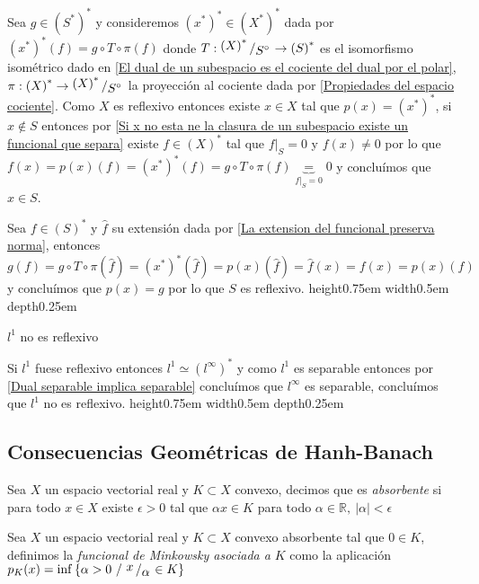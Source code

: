\documentclass[11pt]{article}
\newcommand{\R}{{\mathbb{R}}}
\newcommand{\dual}[1]{\left(#1\right)^{\ast}}
\newcommand{\ddual}[1]{\left(#1^{\ast}\right)^{\ast}}
\newcommand{\abs}[1]{\left\lvert#1\right\rvert}
\newcommand{\sett}[1]{\left\lbrace#1\right\rbrace}
\newcommand{\quotient}[2]{{\raisebox{.2em}{$#1$}\left/\raisebox{-.2em}{$#2$}\right.}}
\numberwithin{theorem}{subsection}
\newenvironment{proof}[1][Demostraci\'on]{\begin{trivlist}
		\item[\hskip \labelsep {\bfseries #1}]}{\end{trivlist}}
\newenvironment{definition}[1][Definici\'on]{\begin{trivlist}
		\item[\hskip \labelsep {\bfseries #1}]}{\end{trivlist}}
\newenvironment{remark}[1][Observaci\'on]{\begin{trivlist}
		\item[\hskip \labelsep {\bfseries #1}]}{\end{trivlist}}
\newcommand{\qed}{\nobreak \ifvmode \relax \else
	\ifdim\lastskip<1.5em \hskip-\lastskip
	\hskip1.5em plus0em minus0.5em \fi \nobreak
	\vrule height0.75em width0.5em depth0.25em\fi}
\begin{document}
\begin{proof}
	Sea $g \in \ddual{S}$ y consideremos $\ddual{x} \in \ddual{X}$ dada por $\ddual{x}(f) = g \circ T \circ \pi (f)$ donde $T: \quotient{\dual{X}}{S^{\circ}} \rightarrow \dual{S}$ es el isomorfismo isom\'etrico dado en \ref{El dual de un subespacio es el cociente del dual por el polar}, $\pi: \dual{X} \rightarrow \quotient{\dual{X}}{S^{\circ}}$ la proyecci\'on al cociente dada por \ref{Propiedades del espacio cociente}. Como $X$ es reflexivo entonces existe $x \in X$ tal que $p(x) = \ddual{x}$, si $x \not \in S$ entonces por \ref{Si x no esta ne la clasura de un subespacio existe un funcional que separa} existe $f \in \dual{X}$ tal que $f\vert_S = 0$ y $f(x) \neq 0$ por lo que $f(x) = p(x)(f) = \ddual{x}(f) = g \circ T \circ \pi (f) \underbrace{=}_{f \vert_S = 0} 0$ y conclu\'imos que $x \in S$.
	
	
	Sea $f \in \dual{S}$ y $\hat{f}$ su extensi\'on dada por \ref{La extension del funcional preserva norma}, entonces $g(f) = g \circ T \circ \pi (\hat{f}) = \ddual{x}(\hat{f}) = p(x) (\hat{f}) = \hat{f}(x) = f(x) = p(x)(f)$ y conclu\'imos que $p(x) = g$ por lo que $S$ es reflexivo. \qed
	
\end{proof}

\begin{remark}
	$l^1$ no es reflexivo
\end{remark}

\begin{proof}
	Si $l^1$ fuese reflexivo entonces $l^1 \simeq \dual{l^{\infty}}$ y como $l^1$ es separable entonces por \ref{Dual separable implica separable} conclu\'imos que $l^{\infty}$ es separable, conclu\'imos que $l^1$ no es reflexivo. \qed
\end{proof}

\subsection{Consecuencias Geom\'etricas de Hanh-Banach}

\begin{definition}
	Sea $X$ un espacio vectorial real y $K \subset X$ convexo, decimos que es \textit{absorbente} si para todo $x \in X$ existe $\epsilon > 0$ tal que $\alpha x \in K$ para todo $\alpha \in \R, \ \abs{\alpha} < \epsilon$
\end{definition}

\begin{definition}
	Sea $X$ un espacio vectorial real y $K \subset X$ convexo absorbente tal que $0 \in K$, definimos la \textit{funcional de Minkowsky asociada a } $K$ como la aplicaci\'on $p_K(x) = \inf \sett{\alpha > 0 \ / \ \quotient{x}{\alpha} \in K}$
\end{definition}
\end{document}
